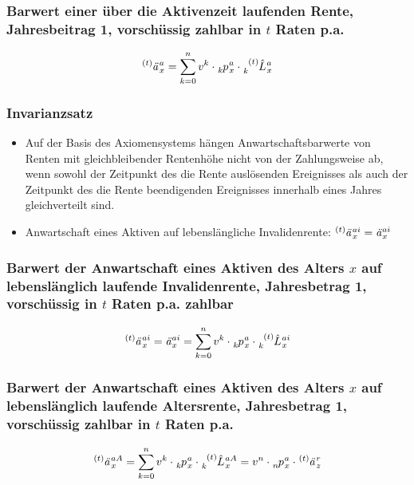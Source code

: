 \documentclass[12pt]{report}
\theoremstyle{dotless}
\theoremstyle{definition}
\begin{document}
\subsubsection{Barwert einer über die Aktivenzeit laufenden Rente, Jahresbeitrag 1, vorschüssig zahlbar in $t$ Raten p.a.}
\begin{equation}
	\tensor[^{(t)}]{\text{\textit{ä}}}{}_x^a=\sum_{k = 0}^n v^k \cdot \tensor[_{k}]{p}{}_x^a \cdot  \tensor[_{k}^{(t)}]{\hat{L}}{}_x^a
\end{equation}

 \subsubsection{Invarianzsatz}
 \begin{itemize}
 	\item  Auf der Basis des Axiomensystems hängen Anwartschaftsbarwerte von Renten mit gleichbleibender Rentenhöhe nicht von der Zahlungsweise ab, wenn sowohl der Zeitpunkt des die Rente auslösenden Ereignisses als auch der Zeitpunkt des die Rente beendigenden Ereignisses innerhalb eines Jahres gleichverteilt sind.
 	\item Anwartschaft eines Aktiven auf lebenslängliche Invalidenrente: $\tensor[^{(t)}]{\text{\textit{ä}}}{}_x^{ai} = \text{\textit{ä}}_x^{ai}$
 \end{itemize}

\subsubsection{Barwert der Anwartschaft eines Aktiven des Alters $x$ auf lebenslänglich laufende Invalidenrente, Jahresbetrag 1, vorschüssig in $t$ Raten p.a. zahlbar}
\begin{equation}
	\tensor[^{(t)}]{\text{\textit{ä}}}{}_x^{ai}=\text{\textit{ä}}_x^{ai}=\sum_{k = 0}^n v^k \cdot \tensor[_{k}]{p}{}_x^a \cdot  \tensor[_{k}^{(t)}]{\hat{L}}{}_x^{ai}
\end{equation}

\subsubsection{Barwert der Anwartschaft eines Aktiven des Alters $x$ auf lebenslänglich laufende Altersrente, Jahresbetrag 1, vorschüssig zahlbar in $t$ Raten p.a.}
\begin{equation}
	\tensor[^{(t)}]{\text{\textit{ä}}}{}_x^{aA}=\sum_{k = 0}^n v^k \cdot \tensor[_{k}]{p}{}_x^a \cdot  \tensor[_{k}^{(t)}]{\hat{L}}{}_x^{aA} = v^n \cdot \tensor[_{n}]{p}{}_x^a \cdot \tensor[^{(t)}]{\text{\textit{ä}}}{}_z^{r}
\end{equation}
\end{document}
